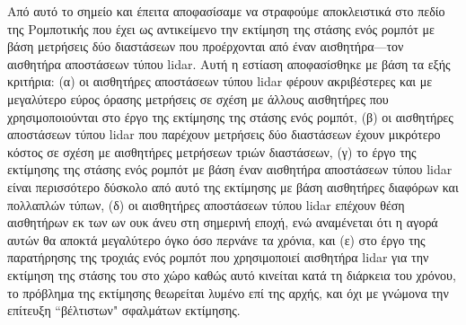 Από αυτό το σημείο και έπειτα αποφασίσαμε να στραφούμε αποκλειστικά στο πεδίο
της Ρομποτικής που έχει ως αντικείμενο την εκτίμηση της στάσης ενός ρομπότ με
βάση μετρήσεις δύο διαστάσεων που προέρχονται από έναν αισθητήρα---τον
αισθητήρα αποστάσεων τύπου lidar. Αυτή η εστίαση αποφασίσθηκε με βάση τα εξής
κριτήρια: (α) οι αισθητήρες αποστάσεων τύπου lidar φέρουν ακριβέστερες και
με μεγαλύτερο εύρος όρασης μετρήσεις σε σχέση με άλλους αισθητήρες που
χρησιμοποιούνται στο έργο της εκτίμησης της στάσης ενός ρομπότ, (β) οι
αισθητήρες αποστάσεων τύπου lidar που παρέχουν μετρήσεις δύο διαστάσεων έχουν
μικρότερο κόστος σε σχέση με αισθητήρες μετρήσεων τριών διαστάσεων, (γ) το έργο
της εκτίμησης της στάσης ενός ρομπότ με βάση έναν αισθητήρα αποστάσεων τύπου
lidar είναι περισσότερο δύσκολο από αυτό της εκτίμησης με βάση αισθητήρες
διαφόρων και πολλαπλών τύπων, (δ) οι αισθητήρες αποστάσεων τύπου lidar επέχουν
θέση αισθητήρων εκ των ων ουκ άνευ στη σημερινή εποχή, ενώ αναμένεται ότι η
αγορά αυτών θα αποκτά μεγαλύτερο όγκο όσο περνάνε τα χρόνια, και (ε) στο έργο
της παρατήρησης της τροχιάς ενός ρομπότ που χρησιμοποιεί αισθητήρα lidar για
την εκτίμηση της στάσης του στο χώρο καθώς αυτό κινείται κατά τη διάρκεια του
χρόνου, το πρόβλημα της εκτίμησης θεωρείται λυμένο επί της αρχής, και όχι με
γνώμονα την επίτευξη ``βέλτιστων" σφαλμάτων εκτίμησης.

